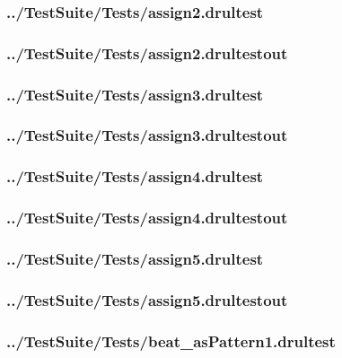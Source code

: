 \begin{changemargin}{-1in}{-1in}
\subsubsection{../TestSuite/Tests/assign2.drultest}


\subsubsection{../TestSuite/Tests/assign2.drultestout}


\subsubsection{../TestSuite/Tests/assign3.drultest}


\subsubsection{../TestSuite/Tests/assign3.drultestout}


\subsubsection{../TestSuite/Tests/assign4.drultest}


\subsubsection{../TestSuite/Tests/assign4.drultestout}


\subsubsection{../TestSuite/Tests/assign5.drultest}


\subsubsection{../TestSuite/Tests/assign5.drultestout}


\subsubsection{../TestSuite/Tests/beat\_asPattern1.drultest}



\end{changemargin}
